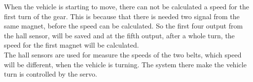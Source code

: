 When the vehicle is starting to move, there can not be calculated a speed for the first turn of the gear. This is because that there is needed two signal from the same magnet, before the speed can be calculated. So the first four output from the hall sensor, will be saved and at the fifth output, after a whole turn, the speed for the first magnet will be calculated.\\

The hall sensors are used for measure the speeds of the two belts, which speed will be different, when the vehicle is turning. The system there make the vehicle turn is controlled by the servo.


